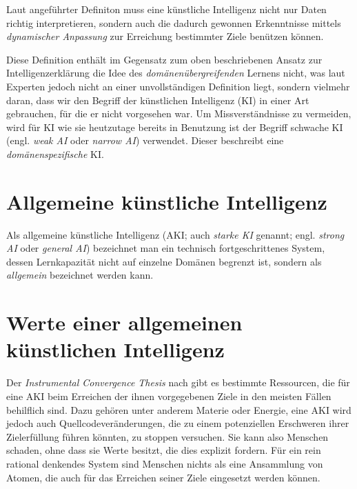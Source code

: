 Laut angeführter Definiton muss eine künstliche Intelligenz nicht nur Daten richtig interpretieren, sondern auch die dadurch gewonnen Erkenntnisse mittels \emph{dynamischer Anpassung} zur Erreichung bestimmter Ziele benützen können.

Diese Definition enthält im Gegensatz zum oben beschriebenen Ansatz zur Intelligenzerklärung die Idee des \emph{domänenübergreifenden} Lernens nicht, was laut Experten jedoch nicht an einer unvollständigen Definition liegt, sondern vielmehr daran, dass wir den Begriff der künstlichen Intelligenz (KI) in einer Art gebrauchen, für die er nicht vorgesehen war. Um Missverständnisse zu vermeiden, wird für KI wie sie heutzutage bereits in Benutzung ist der Begriff schwache KI (engl. \emph{weak AI} oder \emph{narrow AI}) verwendet.  Dieser beschreibt eine \emph{domänenspezifische} KI.

\section{Allgemeine künstliche Intelligenz}
Als allgemeine künstliche Intelligenz (AKI; auch \emph{starke KI} genannt; engl. \emph{strong AI} oder \emph{general AI}) bezeichnet man ein technisch fortgeschrittenes System, dessen Lernkapazität nicht auf einzelne Domänen begrenzt ist, sondern als \emph{allgemein} bezeichnet werden kann. 

\section{Werte einer allgemeinen künstlichen Intelligenz}  \label{Werte}

Der \emph{Instrumental Convergence Thesis}  nach gibt es bestimmte Ressourcen, die für eine AKI beim Erreichen der ihnen vorgegebenen Ziele in den meisten Fällen behilflich sind. Dazu gehören unter anderem Materie oder Energie, eine AKI wird jedoch auch Quellcodeveränderungen, die zu einem potenziellen Erschweren ihrer Zielerfüllung führen könnten, zu stoppen versuchen. Sie kann also Menschen schaden, ohne dass sie Werte besitzt, die dies explizit fordern. Für ein rein rational denkendes System sind Menschen nichts als eine Ansammlung von Atomen, die auch für das Erreichen seiner Ziele eingesetzt werden können.

